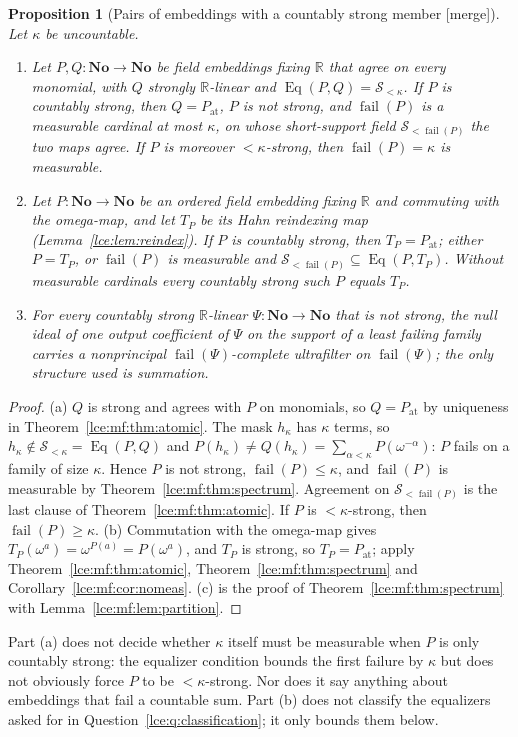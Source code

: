 \documentclass[11pt,letterpaper]{article}
\numberwithin{equation}{section}
\newtheorem{proposition}[theorem]{Proposition}
\theoremstyle{definition}
\theoremstyle{remark}
\newcommand{\No}{\mathbf{No}}
\newcommand{\R}{\mathbb R}
\newcommand{\Sk}{\mathscr S_{<\kappa}}
\newcommand{\thref}[1]{Theorem~\ref{#1}}
\newcommand{\leref}[1]{Lemma~\ref{#1}}
\newcommand{\mergetag}{\textup{\textsf{\small[merge]}}}%
\newcommand{\Eq}{\operatorname{Eq}}
\newcommand{\at}{\mathrm{at}}
\newcommand{\fail}{\operatorname{fail}}
\begin{document}
\begin{proposition}[Pairs of embeddings with a countably strong member \mergetag]
\label{lce:mf:prop:pairs}
Let $\kappa$ be uncountable.
\begin{enumerate}[label=\textup{(\alph*)}]
\item Let $P,Q:\No\to\No$ be field embeddings fixing $\R$ that agree on
every monomial, with $Q$ strongly $\R$-linear and $\Eq(P,Q)=\Sk$. If $P$ is
countably strong, then $Q=P_{\at}$, $P$ is not strong, and $\fail(P)$ is a
measurable cardinal at most $\kappa$, on whose short-support field
$\mathscr S_{<\fail(P)}$ the two maps agree. If $P$ is moreover
${<}\kappa$-strong, then $\fail(P)=\kappa$ is measurable.
\item Let $P:\No\to\No$ be an ordered field embedding fixing $\R$ and
commuting with the omega-map, and let $T_P$ be its Hahn reindexing map
(\leref{lce:lem:reindex}). If $P$ is countably strong, then $T_P=P_{\at}$;
either $P=T_P$, or $\fail(P)$ is measurable and
$\mathscr S_{<\fail(P)}\subseteq\Eq(P,T_P)$. Without measurable cardinals
every countably strong such $P$ equals $T_P$.
\item For every countably strong $\R$-linear $\Psi:\No\to\No$ that is not
strong, the null ideal of one output coefficient of $\Psi$ on the support of
a least failing family carries a nonprincipal $\fail(\Psi)$-complete
ultrafilter on $\fail(\Psi)$; the only structure used is summation.
\end{enumerate}
\end{proposition}
\begin{proof}
(a) $Q$ is strong and agrees with $P$ on monomials, so $Q=P_{\at}$ by
uniqueness in \thref{lce:mf:thm:atomic}. The mask $h_\kappa$ has $\kappa$
terms, so $h_\kappa\notin\Sk=\Eq(P,Q)$ and
$P(h_\kappa)\ne Q(h_\kappa)=\sum_{\alpha<\kappa}P(\omega^{-\alpha})$: $P$
fails on a family of size $\kappa$. Hence $P$ is not strong,
$\fail(P)\le\kappa$, and $\fail(P)$ is measurable by
\thref{lce:mf:thm:spectrum}. Agreement on $\mathscr S_{<\fail(P)}$ is the last
clause of \thref{lce:mf:thm:atomic}. If $P$ is ${<}\kappa$-strong, then
$\fail(P)\ge\kappa$.
(b) Commutation with the omega-map gives
$T_P(\omega^a)=\omega^{P(a)}=P(\omega^a)$, and $T_P$ is strong, so
$T_P=P_{\at}$; apply \thref{lce:mf:thm:atomic},
\thref{lce:mf:thm:spectrum} and Corollary~\ref{lce:mf:cor:nomeas}.
(c) is the proof of \thref{lce:mf:thm:spectrum} with
\leref{lce:mf:lem:partition}.
\end{proof}
Part (a) does not decide whether $\kappa$ itself must be measurable when $P$
is only countably strong: the equalizer condition bounds the first failure
by $\kappa$ but does not obviously force $P$ to be ${<}\kappa$-strong. Nor
does it say anything about embeddings that fail a countable sum. Part (b)
does not classify the equalizers asked for in
Question~\ref{lce:q:classification}; it only bounds them below.
\end{document}
